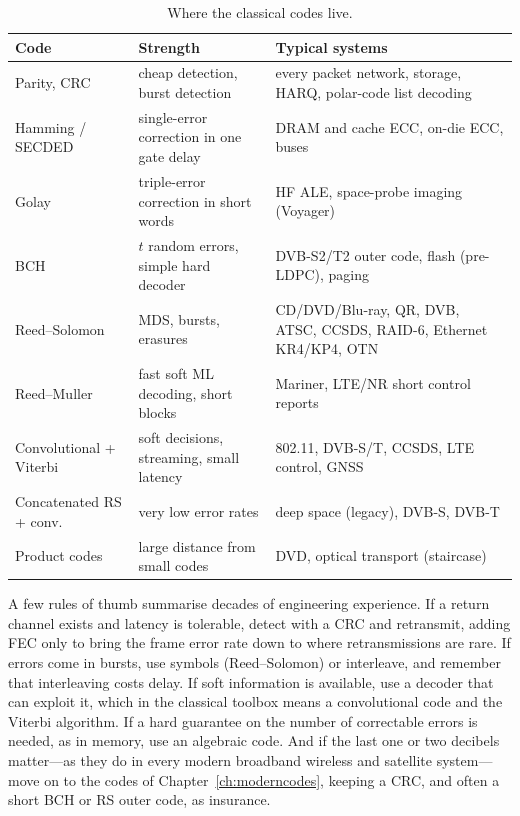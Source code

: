 \begin{table}[htbp]\centering\small
\caption{Where the classical codes live.}
\label{tab:ch14:where}
\begin{tabularx}{\linewidth}{@{}l l X@{}}
\toprule
Code & Strength & Typical systems\\
\midrule
Parity, CRC & cheap detection, burst detection & every packet network, storage, HARQ, polar-code list decoding\\
Hamming / SECDED & single-error correction in one gate delay & DRAM and cache ECC, on-die ECC, buses\\
Golay & triple-error correction in short words & HF ALE, space-probe imaging (Voyager)\\
BCH & $t$ random errors, simple hard decoder & DVB-S2/T2 outer code, flash (pre-LDPC), paging\\
Reed--Solomon & MDS, bursts, erasures & CD/DVD/Blu-ray, QR, DVB, ATSC, CCSDS, RAID-6, Ethernet KR4/KP4, OTN\\
Reed--Muller & fast soft ML decoding, short blocks & Mariner, LTE/NR short control reports\\
Convolutional + Viterbi & soft decisions, streaming, small latency & 802.11, DVB-S/T, CCSDS, LTE control, GNSS\\
Concatenated RS + conv. & very low error rates & deep space (legacy), DVB-S, DVB-T\\
Product codes & large distance from small codes & DVD, optical transport (staircase)\\
\bottomrule
\end{tabularx}
\end{table}

A few rules of thumb summarise decades of engineering experience. If a return channel exists and
latency is tolerable, detect with a CRC and retransmit, adding FEC only to bring the frame error rate
down to where retransmissions are rare. If errors come in bursts, use symbols (Reed--Solomon) or
interleave, and remember that interleaving costs delay. If soft information is available, use a
decoder that can exploit it, which in the classical toolbox means a convolutional code and the Viterbi
algorithm. If a hard guarantee on the number of correctable errors is needed, as in memory, use an
algebraic code. And if the last one or two decibels matter---as they do in every modern broadband
wireless and satellite system---move on to the codes of Chapter~\ref{ch:moderncodes}, keeping a CRC,
and often a short BCH or RS outer code, as insurance.

